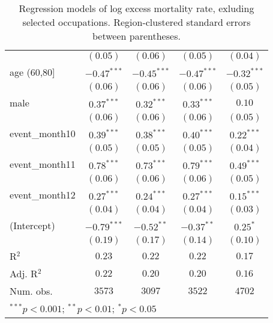 \begin{table}
\begin{center}
\begin{tabular}{l c c c c}
               & $(0.05)$      & $(0.06)$      & $(0.05)$      & $(0.04)$      \\
age (60,80]    & $-0.47^{***}$ & $-0.45^{***}$ & $-0.47^{***}$ & $-0.32^{***}$ \\
               & $(0.06)$      & $(0.06)$      & $(0.06)$      & $(0.05)$      \\
male           & $0.37^{***}$  & $0.32^{***}$  & $0.33^{***}$  & $0.10$        \\
               & $(0.06)$      & $(0.06)$      & $(0.06)$      & $(0.05)$      \\
event\_month10 & $0.39^{***}$  & $0.38^{***}$  & $0.40^{***}$  & $0.22^{***}$  \\
               & $(0.05)$      & $(0.05)$      & $(0.05)$      & $(0.04)$      \\
event\_month11 & $0.78^{***}$  & $0.73^{***}$  & $0.79^{***}$  & $0.49^{***}$  \\
               & $(0.06)$      & $(0.06)$      & $(0.06)$      & $(0.05)$      \\
event\_month12 & $0.27^{***}$  & $0.24^{***}$  & $0.27^{***}$  & $0.15^{***}$  \\
               & $(0.04)$      & $(0.04)$      & $(0.04)$      & $(0.03)$      \\
(Intercept)    & $-0.79^{***}$ & $-0.52^{**}$  & $-0.37^{**}$  & $0.25^{*}$    \\
               & $(0.19)$      & $(0.17)$      & $(0.14)$      & $(0.10)$      \\
\hline
R$^2$          & $0.23$        & $0.22$        & $0.22$        & $0.17$        \\
Adj. R$^2$     & $0.22$        & $0.20$        & $0.20$        & $0.16$        \\
Num. obs.      & $3573$        & $3097$        & $3522$        & $4702$        \\
\hline
\multicolumn{5}{l}{\scriptsize{$^{***}p<0.001$; $^{**}p<0.01$; $^{*}p<0.05$}}
\end{tabular}
\caption{Regression models of log excess mortality rate, exluding selected occupations. Region-clustered standard errors between parentheses.}
\label{tab:altoccmodels}
\end{center}
\end{table}
